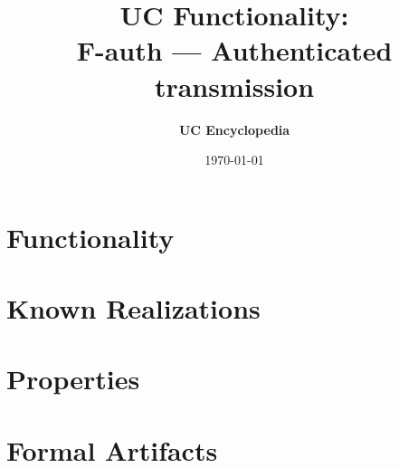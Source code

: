 \documentclass[11pt,a4paper]{article}
\title{\textbf{\Large UC Functionality:}\\[0.2em] \Large F-auth --- Authenticated transmission}
\author{\textbf{UC Encyclopedia}}
\date{\today}
\newtheorem{functionality}{Functionality}
\begin{document}
\maketitle

\begin{abstract}
\end{abstract}

\section{Functionality}

%

\section{Known Realizations}


\section{Properties}


\section{Formal Artifacts}

\end{document}
